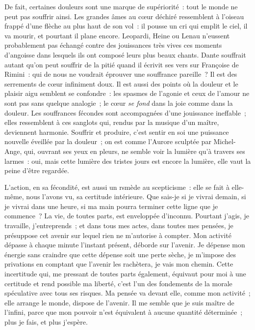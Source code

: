 \documentclass[french,twoside]{book} %
\begin{document}
De fait, certaines douleurs sont une marque de supériorité : tout le monde ne peut pas souffrir ainsi. Les grandes âmes au cœur déchiré ressemblent à l’oiseau frappé d’une flèche au plus haut de son vol : il pousse un cri qui emplit le ciel, il va mourir, et pourtant il plane encore. Leopardi, Heine ou Lenau n’eussent probablement pas échangé contre des jouissances très vives ces moments d’angoisse dans lesquels ils ont composé leurs plus beaux chants. Dante souffrait autant qu’on peut souffrir de la pitié quand il écrivit ses vers sur Françoise de Rimini : qui de nous ne voudrait éprouver une souffrance pareille ? Il est des serrements de cœur infiniment doux. Il est aussi des points où la douleur et le plaisir aigu semblent se confondre : les spasmes de l’agonie et ceux de l’amour ne sont pas sans quelque analogie ; le cœur \emph{se fond} dans la joie comme dans la douleur. Les souffrances fécondes sont accompagnées d’une jouissance ineffable ; elles ressemblent à ces sanglots qui, rendus par la musique d’un maître, deviennent harmonie. Souffrir et produire, c’est sentir en soi une puissance nouvelle éveillée par la douleur ; on est comme l’Aurore sculptée par Michel-Ange, qui, ouvrant ses yeux en pleurs, ne semble voir la lumière qu’à travers ses larmes : oui, mais cette lumière des tristes jours est encore la lumière, elle vaut la peine d’être regardée.\par
L’action, en sa fécondité, est aussi un rsmède au scepticisme : elle se fait à elle-même, nous l’avons vu, sa certitude intérieure. Que sais-je si je vivrai demain, si je vivrai dans une heure, si ma main pourra terminer cette ligne que je commence ? La vie, de toutes parts, est enveloppée d’inconnu. Pourtant j’agis, je travaille, j’entreprends ; et dans tous mes actes, dans toutes mes pensées, je présuppose cet avenir sur lequel rien ne m’autorise à compter. Mon activité dépasse à chaque minute l’instant présent, déborde sur l’avenir. Je dépense mon énergie sans craindre que cette dépense soit une perte sèche, je m’impose des privations en comptant que l’avenir les rachètera, je vais mon chemin. Cette incertitude qui, me pressant de toutes parts également, équivaut pour moi à une certitude et rend possible ma liberté, c’est l’un des fondements de la morale spéculative avec tous ses risques. Ma pensée va devant elle, comme mon activité ; elle arrange le monde, dispose de l’avenir. Il me semble que je suis maître de l’infini, parce que mon pouvoir n’est équivalent à aucune quantité déterminée ; plus je fais, et plus j’espère.\par
\end{document}
